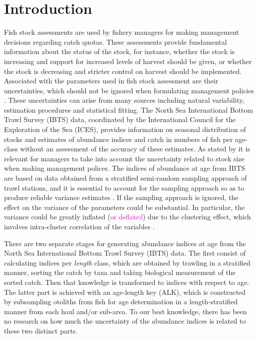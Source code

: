 \documentclass[a4paper 12pt]{article}
\numberwithin{equation}{section}
\newcommand{\natty}[1]{\textcolor{magenta}{#1}}
\begin{document}
\section{Introduction}
Fish stock assessments are used by fishery managers for making management decisions regarding catch quotas. These assessments provide fundamental information about the status of the stock, for instance, whether the stock is increasing and support for increased levels of harvest should be given, or whether the stock is decreasing and stricter control on harvest should be implemented. Associated with the parameters used in fish stock assessment are their uncertainties, which should not be ignored when formulating management policies \citep{ludwig1981measurement, berg2014evaluation}. These uncertainties can arise from many sources including natural variability, estimation procedures and statistical fitting. The North Sea International Bottom Trawl Survey (IBTS) data, coordinated by the International Council for the Exploration of the Sea (ICES), provides information on seasonal distribution of stocks and estimates of abundance indices and catch in numbers of fish per age-class without an assessment of the accuracy of these estimates. As stated by \citet{ludwig1981measurement} it is relevant for managers to take into account the uncertainty related to stock size when making management polices. The indices of abundance at age from IBTS  are based on data obtained from a stratified semi-random sampling approach of trawl stations,  and  it is essential to account for the sampling approach so as to produce reliable variance estimates \citep{lehtonen2004practical}. If the sampling approach is ignored, the effect on the variance  of the parameters could be substantial.  In particular, the variance could be greatly inflated (\natty{or deflated})  due to the clustering effect, which involves intra-cluster correlation of the variables \citep{aanes2015efficient, lehtonen2004practical}. 

There are two separate stages for generating abundance indices at age from the North Sea International Bottom Trawl Survey (IBTS) data.  The first consist of calculating indices per \textit{length} class, which are obtained by trawling in a stratified manner, sorting the catch by taxa and taking biological measurement of the sorted catch. Then that knowledge is transformed to indices with respect to age. The latter part is achieved with an age-length key (ALK), which is constructed by subsampling otoliths from fish for age determination in a length-stratified manner from each haul and/or sub-area. To our best knowledge, there has been no research on how much the uncertainty of the abundance indices is related to these two distinct parts.
\end{document}
